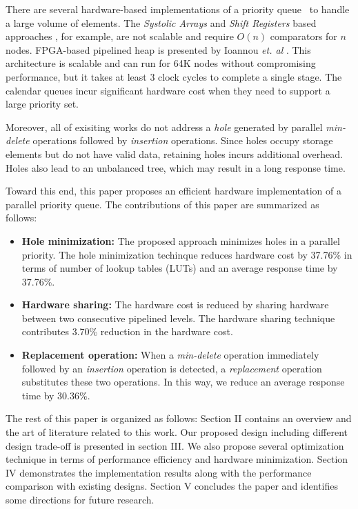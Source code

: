 \documentclass[10pt, conference, compsocconf]{IEEEtran}
\begin{document}
There are several hardware-based implementations of a priority queue~\cite{hw1,hw2,hw8,hw9,fpga1,fpga2,fpga3} to handle a large volume of elements.
The {\it Systolic Arrays} and {\it Shift Registers} based approaches \cite{hw8,hw9}, for example, are not scalable and require $O(n)$ comparators for $n$ nodes.
FPGA-based pipelined heap is presented by Ioannou {\it et. al} \cite{fpga1}.
This architecture is scalable and can run for 64K nodes without compromising performance, but it takes at least 3 clock cycles to complete a single stage.
The calendar queues \cite{hw1} incur significant hardware cost when they need to support a large priority set.

Moreover, all of exisiting works do not address a {\it hole} generated by parallel {\it min-delete} operations followed by {\it insertion} operations.
Since holes occupy storage elements but do not have valid data, retaining holes incurs additional overhead.
Holes also lead to an unbalanced tree, which may result in a long response time.

Toward this end, this paper proposes an efficient hardware implementation of a parallel priority queue.
The contributions of this paper are summarized as follows:
\begin{itemize}
\item {\bf Hole minimization:} The proposed approach minimizes holes in a parallel priority. The hole minimization techinque reduces hardware cost by 37.76\% in terms of number of lookup tables (LUTs) and an average response time by 37.76\%.
\item {\bf Hardware sharing:} The hardware cost is reduced by sharing hardware between two consecutive pipelined levels. The hardware sharing technique contributes 3.70\% reduction in the hardware cost.
\item {\bf Replacement operation:} When a {\it min-delete} operation immediately followed by an {\it insertion} operation is detected, a {\it replacement} operation substitutes these two operations. In this way, we reduce an average response time by 30.36\%.
\end{itemize}

The rest of this paper is organized as follows: Section II contains an overview and the art of literature related to this work.
Our proposed design including different design trade-off is presented in section III. We also propose several optimization technique in terms of performance efficiency and hardware minimization.
Section IV demonstrates the implementation results along with the performance comparison with existing designs.
Section V concludes the paper and identifies some directions for future research.
\end{document}
